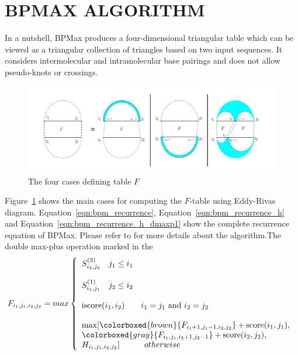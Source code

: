 \section{\uppercase{BPMax ALGORITHM}}
In a nutshell, BPMax produces a four-dimensional triangular table which can be viewed as a triangular collection of triangles based on two input sequences. It considers intermolecular and intramolecular base pairings and does not allow pseudo-knots or crossings.
\begin{figure}[htbp]
\centerline{\includegraphics[scale=.9]{bpmax.png}}
\caption{The four cases defining table $F$}
\label{fig:bpm_eddy_rivas}
\end{figure}
 Figure~\ref{fig:bpm_eddy_rivas} shows the main cases for computing the $F$-table using Eddy-Rivas diagram. Equation~\ref{eqn:bpm_recurrence},   Equation~\ref{eqn:bpm_recurrence_h} and Equation~\ref{eqn:bpm_recurrence_h_dmaxp1}
show the complete recurrence equation of BPMax. Please refer to \cite{EbrahimpourBoroojeny2019} for more details about the algorithm.The double max-plus operation marked in the   
\begin{equation}
\label{eqn:bpm_recurrence}
F_{i_{1},j_{1}, i_{2}, j_{2}}  =max \left \{\begin{array}{lr}
                 S_{i_{2}, j_{2}}^{(2)}   \hspace{10pt} j_{1}\le i_{1} \\
                 \\
                 S_{i_{1}, j_{1}}^{(1)}   \hspace{10pt} j_{2}\le i_{2} \\
                 \\
                 \text{iscore}(i_{1}, i_{2})   \hspace{20pt}  i_{1} = j_{1} \text{ and }  i_{2} = j_{2} \\
                 \\
                 \max[ \colorboxed{brown}{F_{i_{1}+1, j_{1}-1, i_{2}, j_{2}}} + \text{score}(i_{1}, j_{1}), \\
                      \colorboxed{gray}{F_{i_{1}, j_{1}, i_{2}+1, j_{2}-1}} + \text{score}(i_{2}, j_{2}), \\
                      H_{i_{1},j_{1},i_{2},j_{2}}]   \hspace{30pt}  otherwise
               \end{array}
           \right. \\
\end{equation}
